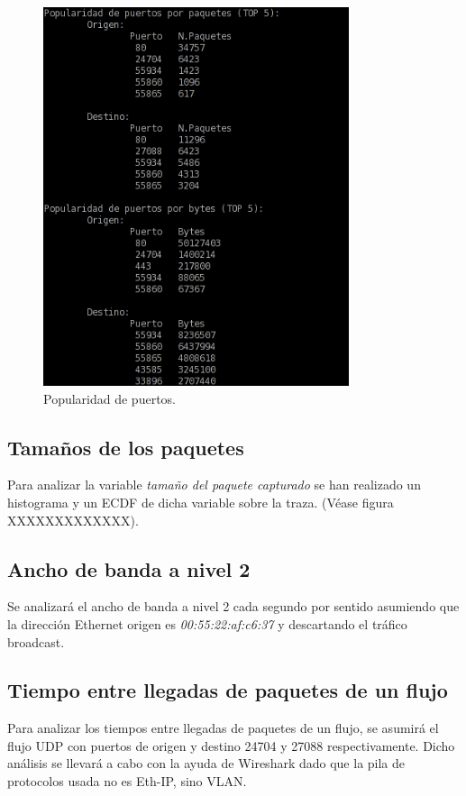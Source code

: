 \documentclass[a4paper, 11pt]{article}	%
\begin{document}
\begin{figure}[H]
\centering
\includegraphics[width=0.8\textwidth]{popularidadPuertos.png}
\caption{Popularidad de puertos.}
\label{fig:popPuertos}
\end{figure}

\subsection{Tamaños de los paquetes}
Para analizar la variable \textit{tamaño del paquete capturado} se han realizado un histograma y un ECDF de dicha variable sobre la traza. (Véase figura XXXXXXXXXXXXX).

\subsection{Ancho de banda a nivel 2}
Se analizará el ancho de banda a nivel 2 cada segundo por sentido asumiendo que la dirección Ethernet origen es \textit{00:55:22:af:c6:37} y descartando el tráfico broadcast.

\subsection{Tiempo entre llegadas de paquetes de un flujo}
Para analizar los tiempos entre llegadas de paquetes de un flujo, se asumirá el flujo UDP con puertos de origen y destino 24704 y 27088 respectivamente. Dicho análisis se llevará a cabo con la ayuda de Wireshark dado que la pila de protocolos usada no es Eth-IP, sino VLAN.
\end{document}
